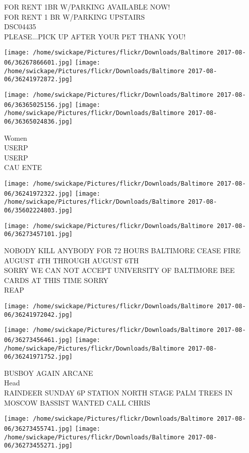 \documentclass[10pt,letterpaper]{article}
\begin{document}
FOR RENT 1BR W/PARKING AVAILABLE NOW!\\
FOR RENT 1 BR W/PARKING UPSTAIRS\\
DSC04435\\
PLEASE...PICK UP AFTER YOUR PET THANK YOU!
\pagebreak

\texttt{[image: /home/swickape/Pictures/flickr/Downloads/Baltimore 2017-08-06/36267866601.jpg]}
\texttt{[image: /home/swickape/Pictures/flickr/Downloads/Baltimore 2017-08-06/36241972872.jpg]}

\texttt{[image: /home/swickape/Pictures/flickr/Downloads/Baltimore 2017-08-06/36365025156.jpg]}
\texttt{[image: /home/swickape/Pictures/flickr/Downloads/Baltimore 2017-08-06/36365024836.jpg]}

Women\\
USERP\\
USERP\\
CAU ENTE
\pagebreak

\texttt{[image: /home/swickape/Pictures/flickr/Downloads/Baltimore 2017-08-06/36241972322.jpg]}
\texttt{[image: /home/swickape/Pictures/flickr/Downloads/Baltimore 2017-08-06/35602224803.jpg]}

\texttt{[image: /home/swickape/Pictures/flickr/Downloads/Baltimore 2017-08-06/36273457101.jpg]}

NOBODY KILL ANYBODY FOR 72 HOURS BALTIMORE CEASE FIRE AUGUST 4TH THROUGH AUGUST 6TH\\
SORRY WE CAN NOT ACCEPT UNIVERSITY OF BALTIMORE BEE CARDS AT THIS TIME SORRY\\
REAP
\pagebreak

\texttt{[image: /home/swickape/Pictures/flickr/Downloads/Baltimore 2017-08-06/36241972042.jpg]}

\vspace{0.25in}
\texttt{[image: /home/swickape/Pictures/flickr/Downloads/Baltimore 2017-08-06/36273456461.jpg]}
\texttt{[image: /home/swickape/Pictures/flickr/Downloads/Baltimore 2017-08-06/36241971752.jpg]}

BUSBOY AGAIN ARCANE\\
Head\\
RAINDEER SUNDAY 6P STATION NORTH STAGE PALM TREES IN MOSCOW BASSIST WANTED CALL CHRIS
\pagebreak

\texttt{[image: /home/swickape/Pictures/flickr/Downloads/Baltimore 2017-08-06/36273455741.jpg]}
\texttt{[image: /home/swickape/Pictures/flickr/Downloads/Baltimore 2017-08-06/36273455271.jpg]}
\end{document}
